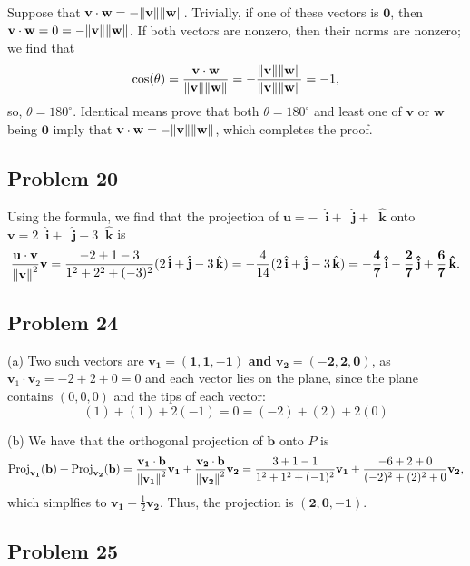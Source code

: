\documentclass[11pt]{article}
\renewcommand{\vec}[1]{\mathbf{#1}}
\newcommand{\uvec}[1]{\mathop{} \!\hat{\mathbf{#1}}}
\begin{document}
Suppose that $\vec{v} \cdot \vec{w} = -\norm{\vec{v}}\norm{\vec{w}}$. Trivially, if one of these vectors is $\vec{0}$, then $\vec{v} \cdot \vec{w} = 0 = -\norm{\vec{v}}\norm{\vec{w}}$. If both vectors are nonzero, then their norms are nonzero; we find that  
\[ 
	\cos(\theta) = \frac{\vec{v} \cdot \vec{w}}{\norm{\vec{v}}\norm{\vec{w}}} = - \frac{\norm{\vec{v}}\norm{\vec{w}}}{{\norm{\vec{v}}\norm{\vec{w}}}} = -1,
\]
so, $\theta = 180^{\circ}$. Identical means prove that both $\theta = 180^{\circ}$ and least one of $\vec{v}$ or $\vec{w}$ being $\vec{0}$ imply that $\vec{v} \cdot \vec{w} = -\norm{\vec{v}}\norm{\vec{w}}$, which completes the proof.

\subsection*{Problem 20}

Using the formula, we find that the projection of $\vec{u} = - \uvec{i}+ \uvec{j} + \uvec{k}$ onto $\vec{v} = 2 \uvec{i} + \uvec{j}- 3 \uvec{k}$ is
\[ 
	\frac{\vec{u} \cdot \vec{v}}{\norm{\vec{v}}^2} \vec{v} = \frac{-2 + 1 - 3}{1^2 + 2^2 + (-3)^2} (2 \uvec{i} + \uvec{j} - 3 \uvec{k}) = -\frac{4}{14} (2 \uvec{i} + \uvec{j} - 3 \uvec{k}) = \mathbf{- \frac{4}{7} \uvec{i} - \frac{2}{7} \uvec{j} + \frac{6}{7} \uvec{k}}. 
\]

\subsection*{Problem 24}

(a) Two such vectors are $\mathbf{\vec{v_{1}} = (1, 1, -1)}$ \textbf{and} $\mathbf{\vec{v_{2}} = (-2, 2, 0)}$, as $\vec{v}_{1} \cdot \vec{v}_{2} = -2 + 2 + 0 = 0$ and each vector lies on the plane, since the plane contains $(0, 0, 0)$ and the tips of each vector:
\[ 
	(1) + (1) + 2(-1) = 0 = (-2) + (2) + 2(0)
\]

(b) We have that the orthogonal projection of $\vec{b}$ onto $P$ is 
\[
	\operatorname{Proj}_{\vec{v_{1}}} (\vec{b}) +\operatorname{Proj}_{\vec{v_{2}}} (\vec{b}) = \frac{\vec{v_{1}} \cdot \vec{b}}{\norm{\vec{v_{1}}}^2} \vec{v_{1}} + \frac{\vec{v_{2}} \cdot \vec{b}}{\norm{\vec{v_{2}}}^2} \vec{v_{2}} = \frac{3 + 1 - 1}{1^2 + 1^2 + (-1)^2} \vec{v_{1}} + \frac{-6 + 2 + 0}{(-2)^2 + (2)^2 + 0} \vec{v_{2}}, 
\]
which simplfies to $\vec{v_{1}} - \tfrac{1}{2}\vec{v_{2}}$. Thus, the projection is $\mathbf{(2, 0, -1)}$.

\subsection*{Problem 25}
\end{document}
